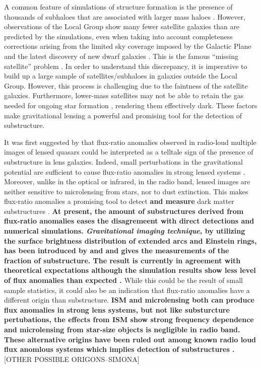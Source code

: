 \documentclass[useAMS,usenatbib]{mnras}
\begin{document}
A common feature of simulations of structure formation is the presence
of thousands of subhaloes that are associated with larger mass haloes \citep[e.g.][]{Springel08}.
However, observations of the Local Group show many fewer satellite
galaxies than are predicted by the simulations, even when taking into
account completeness corrections arising from the limited sky coverage
imposed by the Galactic Plane and the latest discovery of new dwarf galaxies \citep{DES15,Kop15}.  
This is the famous ``missing satellite'' problem \citep{Klypin1999, Moore1999, S07}. In order to
understand this discrepancy, it is imperative to build up a large
sample of satellites/subhaloes in galaxies outside the Local Group.
 However, this process is challenging due to the faintness of the satellite
galaxies.  Furthermore, lower-mass satellites may not be able to
retain the gas needed for ongoing star formation \citep[e.g.][]{P11},
rendering them effectively dark.  These factors make gravitational
lensing a powerful and promising tool for the detection of
substructure.

It was first suggested by \citet{Mao1998} that flux-ratio anomalies
observed in radio-loud multiple images of lensed quasars could be
interpreted as a telltale sign of the presence of substructure in lens
galaxies.  Indeed, small perturbations in the gravitational potential
are sufficient to cause flux-ratio anomalies in strong lensed systems
\citep{Bradac02}.  Moreover, unlike in the optical or infrared, in the
radio band, lensed images are neither sensitive to microlensing from
stars, nor to dust extinction. This makes flux-ratio anomalies a promising
tool to detect \textbf{and measure} dark matter substructures \citep{Dalal2002,N13}.  
\textbf{At present, the amount of substructures derived from flux-ratio anomalies eases the disagremeent with direct detections and numerical simulations.
\emph{Gravitational imaging technique}, by utilizing the surface brightness distribution of extended arcs and Einstein rings,
has been introduced by \citet{K05} and \citet{V09} and gives the measurements of the fraction of
substructure. The result
is currently in agreement with theoretical expectations \citep{V14a,V12} although the simulation results show less level of flux anomalies than expected \citep{Xu14}.}
While this could be the result of small sample
statistics, it could also be an indication that flux-ratio anomalies
have a different origin than substructure. \textbf{ISM and microlensing both can produce flux anomalies in strong lens systems, but not like substurcture pertubations, the effects from ISM show strong frequency dependence and  microlensing from star-size objects is negligible in radio band. These alternative origins have been ruled out among known radio loud flux anomlous systems which implies detection of substructures \citep{KD04}. }[OTHER POSSIBLE ORIGONS--SIMONA]
%
\end{document}
